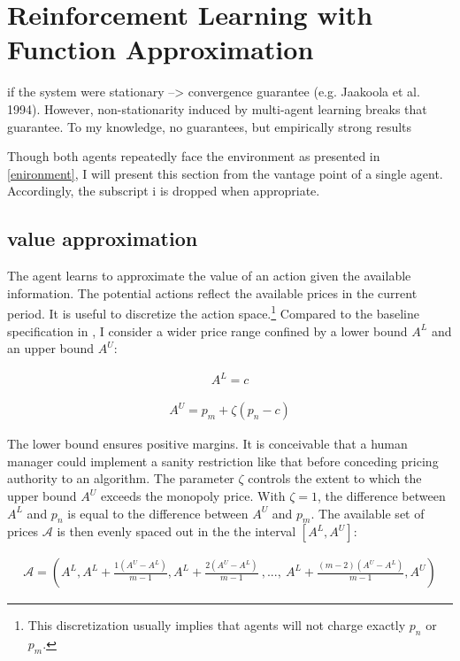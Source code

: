\section{Reinforcement Learning with Function Approximation}

if the system were stationary --> convergence guarantee (e.g. Jaakoola et al. 1994). However, non-stationarity induced by multi-agent learning breaks that guarantee. To my knowledge, no guarantees, but empirically strong results

Though both agents repeatedly face the environment as presented in \autoref{enironment}, I will present this section from the vantage point of a single agent. Accordingly, the subscript {i} is dropped when appropriate.

\subsection{value approximation}\label{value_approximation}

The agent learns to approximate the value of an action given the available information. The potential actions reflect the available prices in the current period. It is useful to discretize the action space.\footnote{This discretization usually implies that agents will not charge exactly $p_n$ or $p_m$.} Compared to the baseline specification in \textcite{calvano_artificial_2019}, I consider a wider price range confined by a lower bound $A^L$ and an upper bound $A^U$:

\begin{gather}
A^{L} = c
\end{gather}

\begin{gather}
A^{U} = p_m + \zeta (p_n - c)
\end{gather}

The lower bound ensures positive margins. It is conceivable that a human manager could implement a sanity restriction like that before conceding pricing authority to an algorithm. The parameter $\zeta$ controls the extent to which the upper bound $A^U$ exceeds the monopoly price. With $\zeta = 1$, the difference between $A^{L}$ and $p_n$ is equal to the difference between $A^{U}$ and $p_m$. The available set of prices $\mathcal{A}$ is then evenly spaced out in the the interval $[A^L, A^U]$:

\begin{gather}
	\mathcal{A} = (A^L, A^L + \frac{1(A^U - A^L)}{m-1}, A^L + \frac{2(A^U - A^L)}{m-1}~ , ... , ~ A^L + \frac{(m-2)(A^U - A^L)}{m-1}, A^U)
\end{gather}

